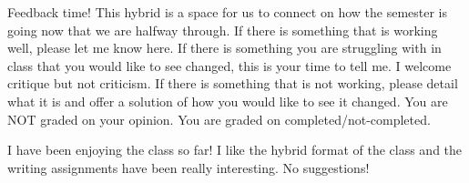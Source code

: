 \documentclass{article}
\begin{document}
\setcounter{section}{8}
\begin{prompt}
  Feedback time!
  This hybrid is a space for us to connect on how the semester is going now that we are halfway through.
  If there is something that is working well, please let me know here.
  If there is something you are struggling with in class that you would like to see changed, this is your time to tell me.
  I welcome critique but not criticism.
  If there is something that is not working, please detail what it is and offer a solution of how you would like to see it changed.
  You are NOT graded on your opinion.
  You are graded on completed/not-completed.
\end{prompt}
I have been enjoying the class so far!
I like the hybrid format of the class and the writing assignments have been really interesting.
No suggestions!
\end{document}
